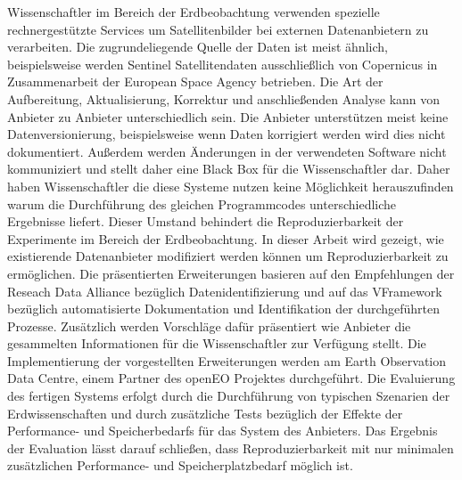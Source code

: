 \documentclass[draft,final]{vutinfth} %
\begin{document}
\begin{kurzfassung}
Wissenschaftler im Bereich der Erdbeobachtung verwenden spezielle rechnergestützte Services um Satellitenbilder bei externen Datenanbietern zu verarbeiten. Die zugrundeliegende Quelle der Daten ist meist ähnlich, beispielsweise werden Sentinel Satellitendaten ausschließlich von Copernicus in Zusammenarbeit der European Space Agency betrieben. Die Art der Aufbereitung, Aktualisierung, Korrektur und anschließenden Analyse kann von Anbieter zu Anbieter unterschiedlich sein. 
Die Anbieter unterstützen meist keine Datenversionierung, beispielsweise wenn Daten korrigiert werden wird dies nicht dokumentiert. Außerdem werden Änderungen in der verwendeten Software nicht kommuniziert und stellt daher eine Black Box für die Wissenschaftler dar. Daher haben Wissenschaftler die diese Systeme nutzen keine Möglichkeit herauszufinden warum die Durchführung des gleichen Programmcodes unterschiedliche Ergebnisse liefert. Dieser Umstand behindert die Reproduzierbarkeit der Experimente im Bereich der Erdbeobachtung. 
In dieser Arbeit wird gezeigt, wie existierende Datenanbieter modifiziert werden können um Reproduzierbarkeit zu ermöglichen. Die präsentierten Erweiterungen basieren auf den Empfehlungen der Reseach Data Alliance bezüglich Datenidentifizierung und auf das {\mbox{VFramework}} bezüglich automatisierte Dokumentation und Identifikation der durchgeführten Prozesse. Zusätzlich werden Vorschläge dafür präsentiert wie Anbieter die gesammelten Informationen für die Wissenschaftler zur Verfügung stellt. Die Implementierung der vorgestellten Erweiterungen werden am Earth Observation Data Centre, einem Partner des openEO Projektes durchgeführt. Die Evaluierung des fertigen Systems erfolgt durch die Durchführung von typischen Szenarien der Erdwissenschaften und durch zusätzliche Tests bezüglich der Effekte der Performance- und Speicherbedarfs für das System des Anbieters. Das Ergebnis der Evaluation lässt darauf schließen, dass Reproduzierbarkeit mit nur minimalen zusätzlichen Performance- und Speicherplatzbedarf möglich ist.          
\end{kurzfassung}
\end{document}
